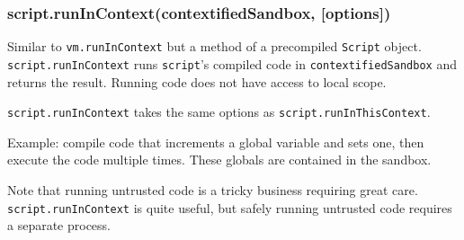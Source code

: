 \subsubsection{script.runInContext(contextifiedSandbox,
{[}options{]})}\label{script.runincontextcontextifiedsandbox-options}

Similar to \texttt{vm.runInContext} but a method of a precompiled
\texttt{Script} object. \texttt{script.runInContext} runs
\texttt{script}'s compiled code in \texttt{contextifiedSandbox} and
returns the result. Running code does not have access to local scope.

\texttt{script.runInContext} takes the same options as
\texttt{script.runInThisContext}.

Example: compile code that increments a global variable and sets one,
then execute the code multiple times. These globals are contained in the
sandbox.

\begin{Shaded}
\begin{Highlighting}[]
 \NormalTok{(}\NormalTok{);}
 \NormalTok{(}\NormalTok{);}

 
  \NormalTok{: }\NormalTok{,}
  \NormalTok{: }
\NormalTok{\};}

  \NormalTok{(}\NormalTok{);}

 \NormalTok{(} 
\NormalTok{\}}

\NormalTok{(}

\end{Highlighting}
\end{Shaded}

Note that running untrusted code is a tricky business requiring great
care. \texttt{script.runInContext} is quite useful, but safely running
untrusted code requires a separate process.

